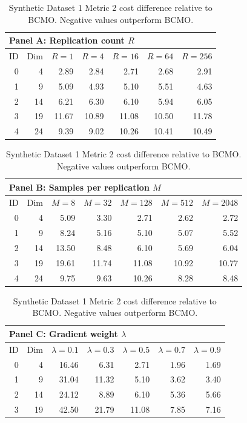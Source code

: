 \begin{table}[htbp]
\centering
\small
\setlength{\tabcolsep}{6pt}
\renewcommand{\arraystretch}{1.08}
\caption{Synthetic Dataset 1 Metric 2 cost difference relative to BCMO. Negative values outperform BCMO.}
\label{tab:synthetic_dataset_1_bcmo_difference_metric2}
\begin{tabular}{rrrrrrr}
\toprule
\multicolumn{7}{l}{\textbf{Panel A: Replication count $R$}} \\
\midrule
ID & Dim & $R=1$ & $R=4$ & $R=16$ & $R=64$ & $R=256$ \\
\midrule
0 & 4 & 2.89 & 2.84 & 2.71 & 2.68 & 2.91 \\
1 & 9 & 5.09 & 4.93 & 5.10 & 5.51 & 4.63 \\
2 & 14 & 6.21 & 6.30 & 6.10 & 5.94 & 6.05 \\
3 & 19 & 11.67 & 10.89 & 11.08 & 10.50 & 11.78 \\
4 & 24 & 9.39 & 9.02 & 10.26 & 10.41 & 10.49 \\
\bottomrule
\end{tabular}
\par\medskip
\begin{tabular}{rrrrrrr}
\toprule
\multicolumn{7}{l}{\textbf{Panel B: Samples per replication $M$}} \\
\midrule
ID & Dim & $M=8$ & $M=32$ & $M=128$ & $M=512$ & $M=2048$ \\
\midrule
0 & 4 & 5.09 & 3.30 & 2.71 & 2.62 & 2.72 \\
1 & 9 & 8.24 & 5.16 & 5.10 & 5.07 & 5.52 \\
2 & 14 & 13.50 & 8.48 & 6.10 & 5.69 & 6.04 \\
3 & 19 & 19.61 & 11.74 & 11.08 & 10.92 & 10.77 \\
4 & 24 & 9.75 & 9.63 & 10.26 & 8.28 & 8.48 \\
\bottomrule
\end{tabular}
\par\medskip
\begin{tabular}{rrrrrrr}
\toprule
\multicolumn{7}{l}{\textbf{Panel C: Gradient weight $\lambda$}} \\
\midrule
ID & Dim & $\lambda=0.1$ & $\lambda=0.3$ & $\lambda=0.5$ & $\lambda=0.7$ & $\lambda=0.9$ \\
\midrule
0 & 4 & 16.46 & 6.31 & 2.71 & 1.96 & 1.69 \\
1 & 9 & 31.04 & 11.32 & 5.10 & 3.62 & 3.40 \\
2 & 14 & 24.12 & 8.89 & 6.10 & 5.36 & 5.66 \\
3 & 19 & 42.50 & 21.79 & 11.08 & 7.85 & 7.16 \\

\end{tabular}
\end{table}

